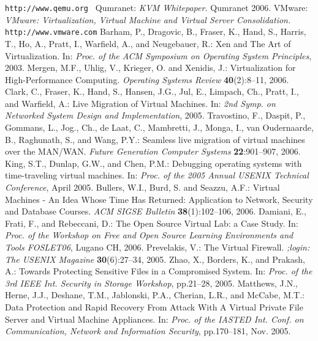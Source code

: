 \documentclass[11pt,a4paper]{llncs}
\begin{document}
\begin{thebibliography}{99}
{\tt http://www.qemu.org }
{\sc Qumranet:}
{\em KVM Whitepaper. }
Qumranet 2006.
{\sc VMware:}
{\em VMware: Virtualization, Virtual Machine and Virtual Server Consolidation.}
{\tt http://www.vmware.com}
{\sc Barham, P., Dragovic, B., Fraser, K., Hand, S., Harris, T., Ho, A., Pratt, I.,
Warfield, A., and Neugebauer, R.:}
{\rm Xen and The Art of Virtualization. }
In: {\em Proc. of the ACM Symposium on Operating System Principles}, 2003.
{\sc Mergen, M.F., Uhlig, V., Krieger, O. and Xenidis, J.:}
{\rm Virtualization for High-Performance Computing.}
{\em Operating Systems Review} {\bfseries 40}(2):8--11, 2006.
{\sc Clark, C., Fraser, K., Hand, S., Hansen, J.G., Jul, E., Limpach, Ch., 
Pratt, I., and Warfield, A.:}
{\rm Live Migration of Virtual Machines. }
In: {\em 2nd Symp. on Networked System Design and Implementation}, 2005.
{\sc Travostino, F., Daspit, P., Gommans, L., Jog., Ch., de Laat, C., 
Mambretti, J., Monga, I., van Oudernaarde, B., Raghunath, S., and Wang, P.Y.:}
{\rm Seamless live migration of virtual machines over the MAN/WAN.}
{\em Future Generation Computer Systems} {\bfseries 22}:901--907, 2006.
{\sc King, S.T., Dunlap, G.W., and Chen, P.M.:}
{\rm Debugging operating systems with time-traveling virtual machines.}
In: {\em Proc. of the 2005 Annual USENIX Technical Conference}, April 2005.
{\sc Bullers, W.I., Burd, S. and Seazzu, A.F.:}
{\rm Virtual Machines - An Idea Whose Time Has Returned: Application to
Network, Security and Database Courses.}
{\em ACM SIGSE Bulletin} {\bfseries 38}(1):102--106, 2006.
{\sc Damiani, E., Frati, F., and Rebeccani, D.:}
{\rm The Open Source Virtual Lab: a Case Study.}
In: {\em Proc. of the Workshop on Free and Open Source Learning Environments 
and Tools FOSLET06}, Lugano CH, 2006.
{\sc Prevelakis, V.:}
{\rm The Virtual Firewall.}
{\em ;login: The USENIX Magazine} {\bfseries 30}(6):27--34, 2005.
{\sc Zhao, X., Borders, K., and Prakash, A.:}
{\rm Towards Protecting Sensitive Files in a Compromised System.}
In: {\em Proc. of the 3rd IEEE Int. Security in Storage Workshop}, pp.21--28, 
2005.
{\sc Matthews, J.N., Herne, J.J., Deshane, T.M., Jablonski, P.A., Cherian, L.R.,
and McCabe, M.T.:}
{\rm Data Protection and Rapid Recovery From Attack With A Virtual Private
File Server and Virtual Machine Appliances.}
In: {\em Proc. of the IASTED Int. Conf. on Communication, Network and 
Information Security}, pp.170--181, Nov. 2005.

\end{thebibliography}
\end{document}
